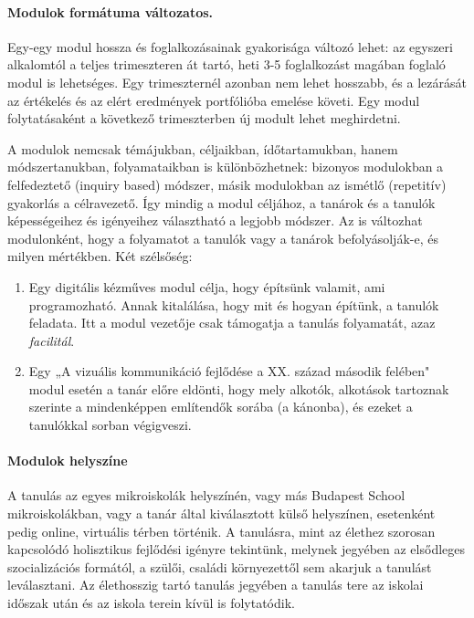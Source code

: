 \paragraph{Modulok formátuma változatos.}
Egy-egy modul hossza és foglalkozásainak gyakorisága változó lehet: az egyszeri alkalomtól a teljes trimeszteren át tartó, heti 3-5 foglalkozást magában foglaló modul is lehetséges. Egy trimeszternél azonban nem lehet hosszabb, és a lezárását az értékelés és az elért eredmények portfólióba emelése követi. Egy modul folytatásaként a következő trimeszterben új modult lehet meghirdetni. 


A modulok nemcsak témájukban, céljaikban, ídőtartamukban, hanem módszertanukban, folyamataikban is különbözhetnek: bizonyos modulokban a felfedeztető (inquiry based) módszer, másik modulokban az ismétlő (repetitív) gyakorlás a célravezető. Így mindig a modul céljához, a tanárok és a tanulók képességeihez és igényeihez választható a legjobb módszer. Az is változhat modulonként, hogy a folyamatot a tanulók vagy a tanárok befolyásolják-e, és milyen mértékben. Két szélsőség:
\begin{enumerate}
\item Egy digitális kézműves modul célja, hogy építsünk valamit, ami programozható. Annak kitalálása, hogy mit és hogyan építünk, a tanulók feladata. Itt a modul vezetője csak támogatja a tanulás folyamatát, azaz \emph{facilitál}.

\item Egy „A vizuális kommunikáció fejlődése a XX. század második felében" modul esetén a tanár előre eldönti, hogy mely alkotók, alkotások tartoznak szerinte a mindenképpen említendők sorába (a kánonba), és ezeket a tanulókkal sorban végigveszi.
\end{enumerate}

\paragraph {Modulok helyszíne}

A tanulás az egyes mikroiskolák helyszínén, vagy más Budapest School mikroiskolákban, vagy a tanár által kiválasztott külső helyszínen, esetenként pedig online, virtuális térben történik. A tanulásra, mint az élethez szorosan kapcsolódó holisztikus fejlődési igényre tekintünk, melynek jegyében az elsődleges szocializációs formától, a szülői, családi környezettől sem akarjuk a tanulást leválasztani. Az élethosszig tartó tanulás jegyében a tanulás tere az iskolai időszak után és az iskola terein kívül is folytatódik.

